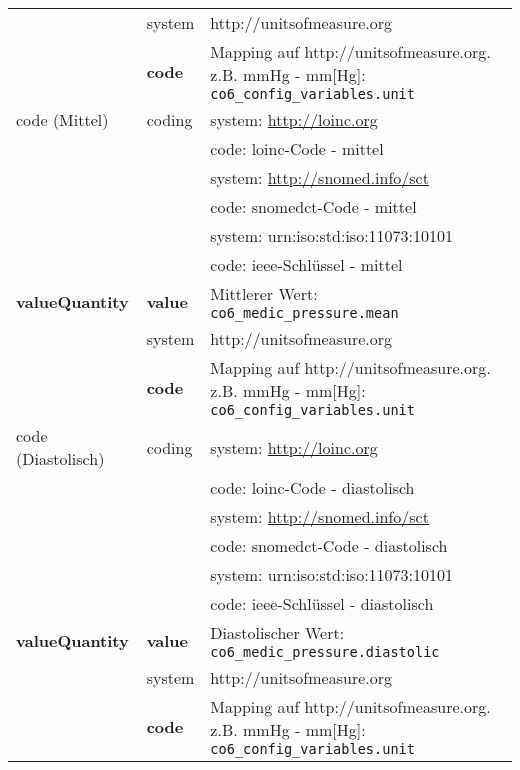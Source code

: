 \begin{longtable}{|l|l|p{7cm}|}
	\cline{2-3}
	& system & http://unitsofmeasure.org \\ 
	\cline{2-3}
	& \textbf{code} & Mapping auf http://unitsofmeasure.org. z.B. mmHg - mm[Hg]: \texttt{co6\_config\_variables.unit} \\ \hline
	code (Mittel) & coding & system: \url{http://loinc.org} \\ 
	\cline{3-3} 
	&  & code: \ac{loinc}-Code - mittel \\ 
	\cline{3-3} 
	&  & system: \url{http://snomed.info/sct} \\ 
	\cline{3-3}
	&  & code: \ac{snomedct}-Code - mittel \\ 
	\cline{3-3} 
	&  & system: urn:iso:std:iso:11073:10101 \\ 
	\cline{3-3}
	&  & code: \ac{ieee}-Schlüssel - mittel \\ \hline	
	\textbf{valueQuantity} & \textbf{value} & Mittlerer Wert: \texttt{co6\_medic\_pressure.mean} \\
	\cline{2-3}
	& system & http://unitsofmeasure.org \\ 
	\cline{2-3}
	& \textbf{code} & Mapping auf http://unitsofmeasure.org. z.B. mmHg - mm[Hg]: \texttt{co6\_config\_variables.unit} \\ \hline
	code (Diastolisch) & coding & system: \url{http://loinc.org} \\ 
	\cline{3-3} 
	&  & code: \ac{loinc}-Code - diastolisch \\ 
	\cline{3-3} 
	&  & system: \url{http://snomed.info/sct} \\ 
	\cline{3-3}
	&  & code: \ac{snomedct}-Code - diastolisch \\ 
	\cline{3-3} 
	&  & system: urn:iso:std:iso:11073:10101 \\ 
	\cline{3-3}
	&  & code: \ac{ieee}-Schlüssel - diastolisch \\ \hline	
	\textbf{valueQuantity} & \textbf{value} & Diastolischer Wert: \texttt{co6\_medic\_pressure.diastolic} \\
	\cline{2-3}
	& system & http://unitsofmeasure.org \\ 
	\cline{2-3}
	& \textbf{code} & Mapping auf http://unitsofmeasure.org. z.B. mmHg - mm[Hg]: \texttt{co6\_config\_variables.unit} \\ \hline
\end{longtable}
